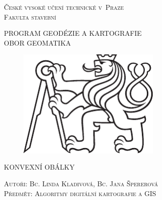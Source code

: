\documentclass[a4paper,11pt,twoside]{article}
\def\author{Autoři: Bc. Linda Kladivová, Bc. Jana Špererová}
\def\nazevprace{KONVEXNÍ OBÁLKY}
\begin{document}
\setcounter{page}{1}  %
\sloppy
\setlength{\parskip}{1pt}



\pagestyle{empty} %

\begin{center}
\renewcommand{\baselinestretch}{1.35} %

\LARGE
\textsc{České vysoké učení technické v~Praze} \\
\textsc{Fakulta stavební} \\

\bigskip

\large
\textsc{PROGRAM GEODÉZIE A KARTOGRAFIE} \\
\textsc{OBOR GEOMATIKA} \\

\vspace{10ex}

\begin{figure}[hbt!] %
\begin{center}
\includegraphics[width=7cm]{pictures/symbol_cvut_konturova_verze_cb.pdf} 
\end{center}
\end{figure}

\vspace{20ex}

\large
\textsc{\nazevprace} \\
\smallskip


\vspace{6ex}

\normalsize
\textsc{\author} \\
\bigskip
\normalsize
\textsc{Předmět: Algoritmy digitální kartografie a GIS} \\

\end{center}
\end{document}
